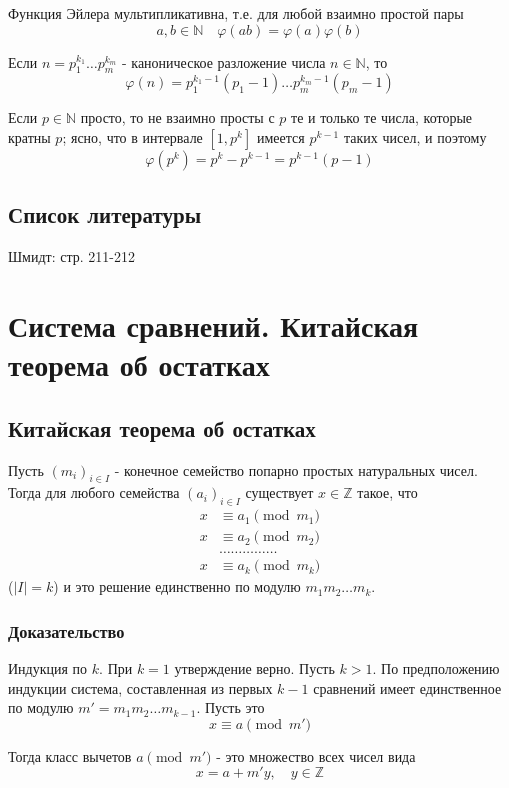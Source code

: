 \documentclass{article}
\begin{document}
Функция Эйлера мультипликативна, т.е. для любой взаимно простой пары \[a, b \in \mathbb N \quad \varphi(ab) = \varphi(a)\varphi(b)\]

Если $n = p_1^{k_1} \dots p_m^{k_m}$ - каноническое разложение числа $n \in \mathbb N$, то
\[ \varphi(n) = p_1^{k_1-1}(p_1 - 1) \dots p_m^{k_m - 1}(p_m - 1) \]

Если $p \in \mathbb N$ просто, то не взаимно просты с $p$ те и только те числа, которые кратны $p$; ясно, что в интервале $[1, p^k]$ имеется $p^{k-1}$ таких чисел, и поэтому
\[ \varphi(p^k) = p^k - p^{k-1} = p^{k-1}(p-1) \]

\subsection*{Список литературы}
Шмидт: стр. 211-212


\newpage
\section{Система сравнений. Китайская теорема об остатках}
\subsection{Китайская теорема об остатках}
Пусть $(m_i)_{i \in I}$ - конечное семейство попарно простых натуральных чисел. Тогда для любого семейства $(a_i)_{i \in I}$ существует $x \in \mathbb Z$ такое, что 
\begin{align*}
x & \equiv a_1 \pmod{m_1} \\
x & \equiv a_2 \pmod{m_2} \\
&\dots \dots \dots \dots \dots \\
x & \equiv a_k \pmod{m_k}
\end{align*}
($|I| = k$) и это решение единственно по модулю $m_1 m_2 \dots m_k$.

\subsubsection*{Доказательство}
Индукция по $k$. При $k = 1$ утверждение верно. Пусть $k > 1$. По предположению индукции система, составленная из первых $k-1$ сравнений имеет единственное по модулю $m' = m_1 m_2 \dots m_{k-1}$. Пусть это \[x \equiv a \pmod{m'}\]

Тогда класс вычетов $a\pmod{m'}$ - это множество всех чисел вида \begin{equation}
\label{eq:20_1}
x = a + m'y, \quad y \in \mathbb Z
\end{equation}
\end{document}
